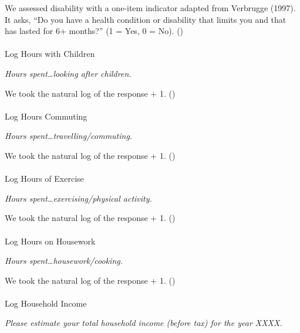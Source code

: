 \documentclass[
  single column]{article}
\makeatletter
\let\oldparagraph\paragraph
\renewcommand{\paragraph}{
    \@ifstar
      \xxxParagraphStar
      \xxxParagraphNoStar
  }
\newcommand{\xxxParagraphStar}[1]{\oldparagraph*{#1}\mbox{}}
\newcommand{\xxxParagraphNoStar}[1]{\oldparagraph{#1}\mbox{}}
\makeatother
\begin{document}
We assessed disability with a one-item indicator adapted from Verbrugge
(1997). It asks, ``Do you have a health condition or disability that
limits you and that has lasted for 6+ months?'' (1 = Yes, 0 = No).
()

\paragraph{Log Hours with Children}\label{log-hours-with-children}

\emph{Hours spent\ldots looking after children.}

We took the natural log of the response + 1.
()

\paragraph{Log Hours Commuting}\label{log-hours-commuting}

\emph{Hours spent\ldots travelling/commuting.}

We took the natural log of the response + 1.
()

\paragraph{Log Hours of Exercise}\label{log-hours-of-exercise}

\emph{Hours spent\ldots exercising/physical activity.}

We took the natural log of the response + 1.
()

\paragraph{Log Hours on Housework}\label{log-hours-on-housework}

\emph{Hours spent\ldots housework/cooking.}

We took the natural log of the response + 1.
()

\paragraph{Log Household Income}\label{log-household-income}

\emph{Please estimate your total household income (before tax) for the
year XXXX.}
\end{document}
